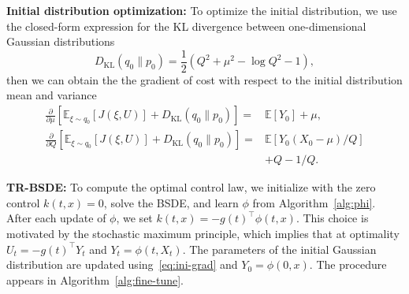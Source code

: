 \documentclass[letterpaper, 10 pt, conference]{ieeeconf}  %
\def\Expect{{\mathbb E}}
\newcommand{\ud}{\,\mathrm{d}}
\newcommand{\Xr}{\tilde X}
\newcommand{\Yr}{\tilde Y}
\begin{document}
\medskip
\noindent
{\bf Initial distribution optimization:} To optimize the initial distribution, we use the closed-form expression for the KL divergence between one-dimensional Gaussian distributions 
\begin{equation*}
    D_\mathrm{KL}(q_0\|p_0) = \frac{1}{2}(Q^2 + \mu^2 - \log Q^2 -1),
\end{equation*}
then we can obtain the the gradient of cost with respect to the initial distribution mean and variance
\begin{subequations}
\label{eq:ini-grad}
\begin{align}
    \frac{\partial}{\partial \mu} [\Expect_{\xi \sim q_0}[ J(\xi,U)]  +  D_\mathrm{KL}(q_0\|p_0)] = & \Expect[Y_0] + \mu,\\ 
    \frac{\partial}{\partial Q}[\Expect_{\xi \sim q_0}[ J(\xi,U)]  +  D_\mathrm{KL}(q_0\|p_0)]  = &\Expect[Y_0(X_0-\mu)/Q] \nonumber \\&+  Q - 1/Q.
\end{align}
\end{subequations}

\medskip
\noindent
{\bf TR-BSDE:} To compute the optimal control law, we initialize with the zero control $k(t,x)=0$, solve the BSDE, and learn $\phi$ from Algorithm~\ref{alg:phi}. After each update of $\phi$, we set
 $k(t,x) = - g(t)^\top \phi(t,x)$. This choice is motivated by the stochastic maximum principle, which implies that at optimality  $U_t=-g(t)^\top Y_t$ and $Y_t=\phi(t,X_t)$. The parameters of the initial Gaussian distribution are updated using~\eqref{eq:ini-grad} and $Y_0 = \phi(0,x)$. The procedure appears in Algorithm~\ref{alg:fine-tune}. 


\end{document}
